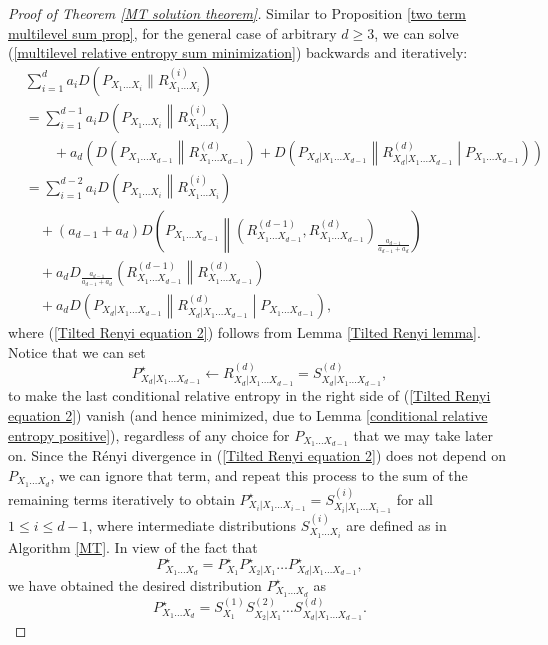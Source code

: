 \documentclass{article}
\begin{document}
\begin{proof}[Proof of Theorem \ref{MT solution theorem}]
Similar to Proposition \ref{two term multilevel sum prop}, for the general case of arbitrary $d\geq 3$, we can solve (\ref{multilevel relative entropy sum minimization}) backwards and iteratively:
\begin{align}
	&\sum_{i=1}^d a_iD\left(P_{X_1\dots X_i}\|R^{(i)}_{X_1\dots X_i}\right)\nonumber\\
	&=\sum_{i=1}^{d-1} a_iD\left(P_{X_1\dots X_i}\middle\|R^{(i)}_{X_1\dots X_{i}}\right)\nonumber\\
	&\qquad+a_d\left(D\left(P_{X_1\dots X_{d-1}}\middle\|R^{(d)}_{X_1\dots X_{d-1}}\right)+D\left(P_{X_d|X_1\dots X_{d-1}}\middle\|R^{(d)}_{X_d|X_1\dots X_{d-1}}\middle|P_{X_1\dots X_{d-1}}\right)\right)\nonumber\\
	&=\sum_{i=1}^{d-2} a_iD\left(P_{X_1\dots X_i}\middle\|R^{(i)}_{X_1\dots X_{i}}\right)\nonumber\\
	&\quad + (a_{d-1}+a_d)D\left(P_{X_1\dots X_{d-1}}\middle\|\left(R_{X_1\dots X_{d-1}}^{(d-1)},R_{X_1\dots X_{d-1}}^{(d)}\right)_{\frac{a_{d-1}}{a_{d-1}+a_d}}\right)\nonumber\\
	&\quad + a_dD_{\frac{a_{d-1}}{a_{d-1}+a_d}}\left(R_{X_1\dots X_{d-1}}^{(d-1)}\middle\|R_{X_1\dots X_{d-1}}^{(d)} \right)\nonumber\\
	&\quad+a_d D\left(P_{X_d|X_1\dots X_{d-1}}\middle\|R^{(d)}_{X_d|X_1\dots X_{d-1}}\middle|P_{X_1\dots X_{d-1}}\right)\label{Tilted Renyi equation 2} ,
\end{align}
where (\ref{Tilted Renyi equation 2}) follows from Lemma \ref{Tilted Renyi lemma}. Notice that we can set 
\begin{equation}
	P^{\star}_{X_d|X_1\dots X_{d-1}}\gets R^{(d)}_{X_d|X_1\dots X_{d-1}}=S^{(d)}_{X_d|X_1\dots X_{d-1}},\nonumber
\end{equation}
to make the last conditional relative entropy in the right side of (\ref{Tilted Renyi equation 2}) vanish (and hence minimized, due to Lemma \ref{conditional relative entropy positive}), regardless of any choice for $P_{X_1\dots X_{d-1}}$ that we may take later on. Since the R\'{e}nyi divergence in (\ref{Tilted Renyi equation 2}) does not depend on $P_{X_1\dots X_d}$, we can ignore that term, and repeat this process to the sum of the remaining terms iteratively to obtain $P^{\star}_{X_i|X_1\dots X_{i-1}}=S^{(i)}_{X_i|X_1\dots X_{i-1}}$ for all $1\leq i\leq d-1$, where intermediate distributions $S^{(i)}_{X_1\dots X_i}$ are defined as in Algorithm \ref{MT}. In view of the fact that
\begin{equation}
    P^{\star}_{X_1\dots X_d}= P^{\star}_{X_1}P^{\star}_{X_2|X_1}\dots P^{\star}_{X_d|X_1\dots X_{d-1}},\nonumber
\end{equation}
we have obtained the desired distribution $P^{\star}_{X_1\dots X_d}$ as
\begin{equation}
    P^{\star}_{X_1\dots X_d}= S^{(1)}_{X_1}S^{(2)}_{X_2|X_1}\dots S^{(d)}_{X_d|X_1\dots X_{d-1}}.\nonumber
\end{equation}
\end{proof}
\end{document}
